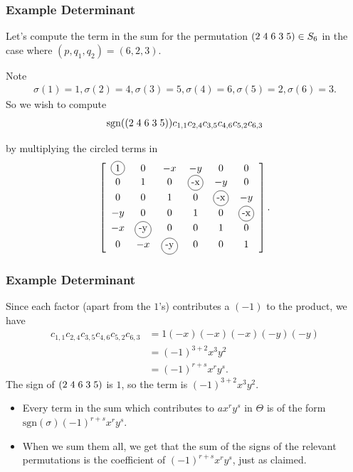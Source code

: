 \documentclass{beamer}
\theoremstyle{plain}
\theoremstyle{definition}
\theoremstyle{remark}
\newcommand{\bb}{\vspace{3mm}}			%
\newcommand{\bee}{\begin{equation}\begin{aligned}}
\newcommand{\eee}{\end{aligned}\end{equation}}
\newcommand*\circled[1]{\tikz[baseline=(char.base)]{
            \node[shape=circle,draw,inner sep=2pt] (char) {#1};}}
\renewcommand{\'}{\hspace{0.5mm}'}		%
\begin{document}
\begin{frame}
\frametitle{Example Determinant}

Let's compute the term in the sum for the permutation
$(2\hspace{1mm}4\hspace{1mm}6\hspace{1mm}3\hspace{1mm}5) \in S_6$ in the case where 
$(p,q_1,q_2) = (6,2,3)$. 
\bb

Note 
\bee
	\sigma(1) = 1, \sigma(2) = 4, \sigma(3) = 5, \sigma(4) = 6, \sigma(5) = 2, \sigma(6) = 3. 
\eee
So we wish to compute
\bee
	\mathrm{sgn}((2\hspace{1mm}4\hspace{1mm}6\hspace{1mm}
	3\hspace{1mm}5))c_{1,1}c_{2,4}c_{3,5}c_{4,6}c_{5,2}c_{6,3}
\eee

by multiplying the circled terms in
\small
\bee
\left[
\begin{array}{cccccc}
\circled{1} & 0 & -x & -y & 0 & 0\\
0 & 1 & 0 & \circled{-x} & -y & 0\\
0 & 0 & 1 & 0 & \circled{-x} & -y\\
-y & 0 & 0 & 1 & 0 & \circled{-x}\\
-x & \circled{-y} & 0 & 0 & 1 & 0\\
0 & -x & \circled{-y} & 0 & 0 & 1\\
\end{array} \right]. 
\eee


\end{frame}


\begin{frame}
\frametitle{Example Determinant}

Since each factor (apart from the $1$'s) contributes
a
$(-1)$ to the product, we have
\bee
	c_{1,1}c_{2,4}c_{3,5}c_{4,6}c_{5,2}c_{6,3} 
	&= 1(-x)(-x)(-x)(-y)(-y) \\
	&= (-1)^{3 + 2}x^3y^2 \\
	&= (-1)^{r + s}x^ry^s. 
\eee
The sign of $(2\hspace{1mm}4\hspace{1mm}6\hspace{1mm}
	3\hspace{1mm}5)$
	is $1$, so the term is $(-1)^{3 + 2}x^3y^2$. 
	\bb

\begin{itemize}
	\item Every term in the sum which contributes to $ax^ry^s$
	in $\Theta$
is of the form $\mathrm{sgn}(\sigma)(-1)^{r + s}x^ry^s$. 
	\item When we sum them all, we get that the sum of the signs
of the relevant permutations is the coefficient of 
$(-1)^{r + s}x^ry^s$, just as claimed. 
\end{itemize}

\end{frame}
\end{document}
